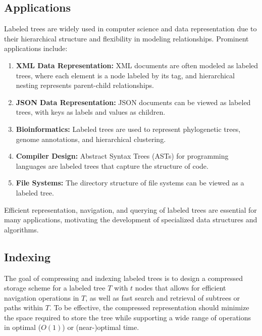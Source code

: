 \subsection{Applications}
Labeled trees are widely used in computer science and data representation due to their hierarchical structure and flexibility in modeling relationships. Prominent applications include:
\begin{enumerate}
    \item \textbf{XML Data Representation:} XML documents are often modeled as labeled trees, where each element is a node labeled by its tag, and hierarchical nesting represents parent-child relationships.
    \item \textbf{JSON Data Representation:} JSON documents can be viewed as labeled trees, with keys as labels and values as children.
    \item \textbf{Bioinformatics:} Labeled trees are used to represent phylogenetic trees, genome annotations, and hierarchical clustering.
    \item \textbf{Compiler Design:} Abstract Syntax Trees (ASTs) for programming languages are labeled trees that capture the structure of code.
    \item \textbf{File Systems:} The directory structure of file systems can be viewed as a labeled tree.
\end{enumerate}

Efficient representation, navigation, and querying of labeled trees are essential for many applications, motivating the development of specialized data structures and algorithms. 

\subsection{Indexing} \label{compandindexinglabtree}
The goal of compressing and indexing labeled trees is to design a compressed storage scheme for a labeled tree $T$ with $t$ nodes that allows for efficient navigation operations in $T$, as well as fast search and retrieval of subtrees or paths within $T$. To be effective, the compressed representation should minimize the space required to store the tree while supporting a wide range of operations in optimal ($O(1)$) or (near-)optimal time.

